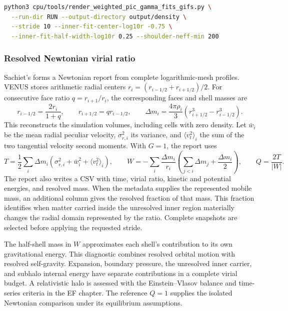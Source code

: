 \begin{lstlisting}[language=bash]
python3 cpu/tools/render_weighted_pic_gamma_fits_gifs.py \
  --run-dir RUN --output-directory output/density \
  --stride 10 --inner-fit-center-log10r -0.75 \
  --inner-fit-half-width-log10r 0.25 --shoulder-neff-min 200
\end{lstlisting}

\subsubsection{Resolved Newtonian virial ratio}

Sachiet's  forms a Newtonian report
from complete logarithmic-mesh profiles. VENUS stores arithmetic radial
centers \(r_i=(r_{i-1/2}+r_{i+1/2})/2\). For consecutive face ratio
\(q=r_{i+1}/r_i\), the corresponding faces and shell masses are
\[
 r_{i-1/2}=\frac{2r_i}{1+q},\qquad
 r_{i+1/2}=q r_{i-1/2},\qquad
 \Delta m_i=\frac{4\pi\rho_i}{3}
                  (r_{i+1/2}^3-r_{i-1/2}^3).           \tag{WPIC-D4}
\]
This reconstructs the simulation volumes, including cells with zero density.
Let \(\bar w_i\) be the mean radial peculiar velocity,
\(\sigma_{r,i}^2\) its variance, and \(\langle v_t^2\rangle_i\) the sum of
the two tangential velocity second moments. With \(G=1\), the report uses
\[
 T=\frac12\sum_i\Delta m_i
       (\sigma_{r,i}^2+\bar w_i^2+\langle v_t^2\rangle_i),\qquad
 W=-\sum_i\frac{\Delta m_i}{r_i}
       \left(\sum_{j<i}\Delta m_j+\frac{\Delta m_i}{2}\right),\qquad
 Q=\frac{2T}{|W|}.                                     \tag{WPIC-D5}
\]
The report also writes a CSV with time, virial ratio, kinetic and potential
energies, and resolved mass. When the metadata supplies the represented
mobile mass, an additional column gives the resolved fraction of that mass.
This fraction identifies when matter carried inside the unresolved inner
region materially changes the radial domain represented by the ratio.
Complete snapshots are selected before applying the requested stride.

The half-shell mass in \(W\) approximates each shell's contribution to its
own gravitational energy. This diagnostic combines resolved orbital motion
with resolved self-gravity. Expansion,
boundary pressure, the unresolved inner carrier, and subhalo internal energy
have separate contributions in a complete virial budget. A relativistic halo
is assessed with the Einstein--Vlasov balance and time-series criteria in the
EF chapter. The reference \(Q=1\) supplies the isolated Newtonian comparison
under its equilibrium assumptions.

